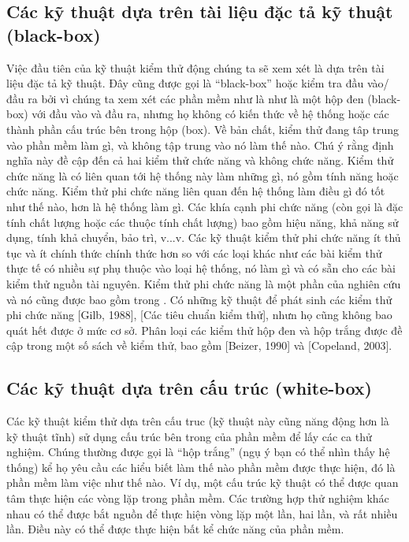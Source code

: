 \documentclass[11pt,a4paper,oneside]{article}
\begin{document}
\subsection {Các kỹ thuật dựa trên tài liệu đặc tả kỹ thuật (black-box)}
Việc đầu tiên của kỹ thuật kiểm thử động chúng ta sẽ xem xét là dựa trên tài liệu đặc tả kỹ thuật. Đây cũng được gọi là “black-box” hoặc kiểm tra đầu vào/đầu ra bởi vì chúng ta xem xét các phần mềm như là như là một hộp đen (black-box) với đầu vào và đầu ra, nhưng họ không có kiến thức về hệ thống hoặc các thành phần cấu trúc bên trong hộp (box). Về bản chất, kiểm thử đang tâp trung vào phần mềm làm gì, và không tập trung vào nó làm thế nào.
Chú ý rằng định nghĩa này đề cập đến cả hai kiểm thử chức năng và không chức năng. Kiểm thử chức năng là có liên quan tới hệ thống này làm những gì, nó gồm tính năng hoặc chức năng. Kiểm thử phi chức năng liên quan đến hệ thống làm điều gì đó tốt như thế nào, hơn là hệ thống làm gì. Các khía cạnh phi chức năng (còn gọi là đặc tính chất lượng hoặc các thuộc tính chất lượng) bao gồm hiệu năng, khả năng sử dụng, tính khả chuyển, bảo trì, v...v. Các kỹ thuật kiểm thử phi chức năng ít thủ tục và ít chính thức chính thức hơn so với các loại khác như các bài kiểm thử thực tế có nhiều sự phụ thuộc vào loại hệ thống, nó làm gì và có sẵn cho các bài kiểm thử nguồn tài nguyên.
Kiểm thử phi chức năng là một phần của nghiên cứu và nó cũng được bao gồm trong \cite{istqb}. Có những kỹ thuật để phát sinh các kiểm thử phi chức năng [Gilb, 1988], [Các tiêu chuẩn kiểm thử], nhưn họ cũng không bao quát hết được ở mức cơ sở. Phân loại các kiểm thử hộp đen và hộp trắng được đề cập trong một số sách về kiểm thử, bao gồm [Beizer, 1990] và [Copeland, 2003].

\subsection {Các kỹ thuật dựa trên cấu trúc (white-box)}
Các kỹ thuật kiểm thử dựa trên cấu truc (kỹ thuật này cũng năng động hơn là kỹ thuật tĩnh) sử dụng cấu trúc bên trong của phần mềm để lấy các ca thử nghiệm. Chúng thường được gọi là “hộp trắng” (ngụ ý bạn có thể nhìn thấy hệ thống) kể họ yêu cầu các hiểu biết làm thế nào phần mềm được thực hiện, đó là phần mềm làm việc như thế nào. Ví dụ, một cấu trúc kỹ thuật có thể được quan tâm thực hiện các vòng lặp trong phần mềm. Các trường hợp thử nghiệm khác nhau có thể được bắt nguồn để thực hiện vòng lặp một lần, hai lần, và rất nhiều lần. Điều này có thể được thực hiện bất kể chức năng của phần mềm.
\end{document}
